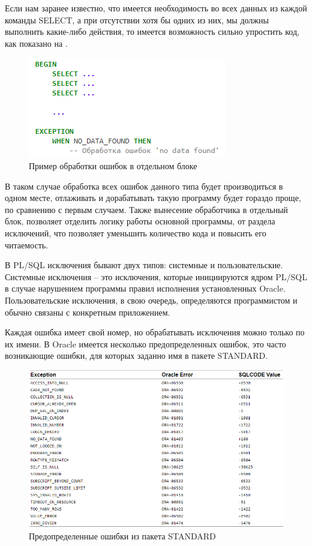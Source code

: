 Если нам заранее известно, что имеется необходимость во всех данных из каждой команды SELECT, а при отсутствии хотя бы одних из них, мы должны выполнить какие-либо действия, то имеется возможность сильно упростить код, как показано на .

\begin{figure}[ht!] 
	\center
	\includegraphics [scale=1] {my_folder/img/C1_code2.png}
	\caption{Пример обработки ошибок в отдельном блоке} 
	\label{fig:c1_code2}  
\end{figure}
\FloatBarrier

В таком случае обработка всех ошибок данного типа будет производиться в одном месте, отлаживать и дорабатывать такую программу будет гораздо проще, по сравнению с первым случаем. 
Также вынесение обработчика в отдельный блок, позволяет отделить логику работы основной программы, от раздела исключений, что позволяет уменьшить количество кода и повысить его читаемость.

В PL/SQL исключения бывают двух типов: системные и пользовательские. Системные исключения – это исключения, которые инициируются ядром PL/SQL в случае нарушением программы правил исполнения установленных Oracle\cite{handling-errors}. Пользовательские исключения, в свою очередь, определяются программистом и обычно связаны с конкретным приложением\cite[с.~133]{ferstein}. 

Каждая ошибка имеет свой номер, но обрабатывать исключения можно только по их имени. В Oracle имеется несколько предопределенных ошибок, это часто возникающие ошибки, для которых заданно имя в пакете STANDARD. 

\begin{figure}[ht!] 
	\center
	\includegraphics [scale=0.75] {my_folder/img/C1_tab1_predef_exceptions}
	\caption{Предопределенные ошибки из пакета STANDARD} 
	\label{fig:C1_tab1_predef}  
\end{figure}
\FloatBarrier

